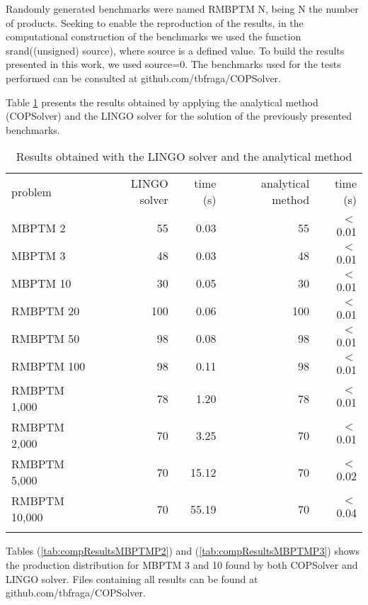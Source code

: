 \documentclass[authoryear,manuscript,12pt]{elsarticle}
\begin{document}
Randomly generated benchmarks were named RMBPTM $\textrm{N}$, being $\textrm{N}$ the number of products. Seeking to enable the reproduction of the results, in the computational construction of the benchmarks we used the function srand((unsigned) source), where source is a defined value. To build the results presented in this work, we used source=0. The benchmarks used for the tests performed can be consulted at github.com/tbfraga/COPSolver.

Table \ref{tab:results} presents the results obtained by applying the analytical method (COPSolver) and the LINGO solver for the solution of the previously presented benchmarks.

\begin{table}[h]
\begin{center}
\begin{footnotesize}
\begin{tabular}[c]{l r r r r}
problem & LINGO solver & time (s) & analytical method & time (s) \\
\cline {1-5} \\
MBPTM 2 & 55 & 0.03 & 55 & $<$ 0.01 \\
MBPTM 3 & 48 & 0.03 & 48 & $<$ 0.01 \\
MBPTM 10 & 30 & 0.05 & 30 & $<$ 0.01 \\
RMBPTM 20 & 100 & 0.06 & 100 & $<$ 0.01 \\
RMBPTM 50 & 98 & 0.08 & 98 & $<$ 0.01 \\
RMBPTM 100 & 98 & 0.11 & 98 & $<$ 0.01 \\
RMBPTM 1,000 & 78 & 1.20 & 78 & $<$ 0.01 \\
RMBPTM 2,000 & 70 & 3.25 & 70 & $<$ 0.01 \\
RMBPTM 5,000 & 70 & 15.12 & 70 & $<$ 0.02 \\
RMBPTM 10,000 & 70 & 55.19 & 70 & $<$ 0.04 \\
\cline {1-5} \\
\end{tabular}
\caption{Results obtained with the LINGO solver and the analytical method}
\label{tab:results}
\end{footnotesize}
\end{center}
\end{table}

Tables (\ref{tab:compResultsMBPTMP2}) and (\ref{tab:compResultsMBPTMP3}) shows the production distribution for MBPTM 3 and 10 found by both COPSolver and LINGO solver. Files containing all results can be found at github.com/tbfraga/COPSolver.
\end{document}
